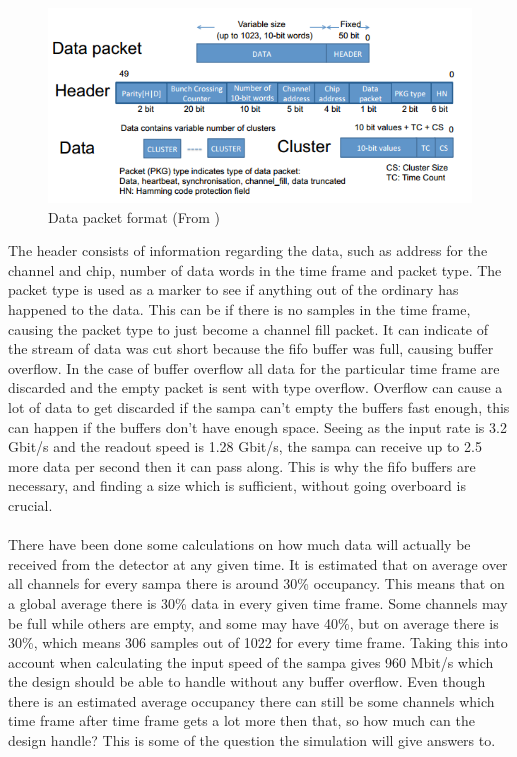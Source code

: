 \documentclass[a4paper]{report}
\begin{document}
{\begin{figure}[h!]
	\centering
		\includegraphics[width=1.0\textwidth]{images/packet.png}
		\caption{Data packet format (From \cite{tdr-015})}
		\label{fig:packet}
\end{figure}

The header consists of information regarding the data, such as address for the channel and chip, number of data words in the time frame and packet type.
The packet type is used as a marker to see if anything out of the ordinary has happened to the data.
This can be if there is no samples in the time frame, causing the packet type to just become a channel fill packet.
It can indicate of the stream of data was cut short because the \gls{fifo} buffer was full, causing buffer overflow.
In the case of buffer overflow all data for the particular time frame are discarded and the empty packet is sent with type overflow.
Overflow can cause a lot of data to get discarded if the \gls{sampa} can't empty the buffers fast enough, this can happen if the buffers don't have enough space.
Seeing as the input rate is 3.2 Gbit/s and the readout speed is 1.28 Gbit/s, the \gls{sampa} can receive up to 2.5 more data per second then it can pass along.
This is why the \gls{fifo} buffers are necessary, and finding a size which is sufficient, without going overboard is crucial.

\paragraph{}
There have been done some calculations on how much data will actually be received from the detector at any given time.
It is estimated that on average over all channels for every \gls{sampa} there is around 30\% occupancy.
This means that on a global average there is 30\% data in every given time frame.
Some channels may be full while others are empty, and some may have 40\%, but on average there is 30\%, which means 306 samples out of 1022 for every time frame.
Taking this into account when calculating the input speed of the \gls{sampa} gives 960 Mbit/s which the design should be able to handle without any buffer overflow.
Even though there is an estimated average occupancy there can still be some channels which time frame after time frame gets a lot more then that, so how much can the design handle?
This is some of the question the simulation will give answers to.

}
\end{document}
